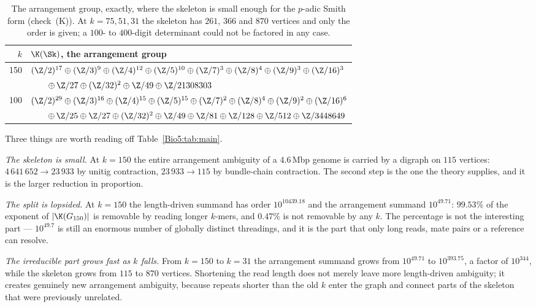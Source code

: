 \begin{table}[ht]
\centering\footnotesize
\begin{tabular}{rl}
\toprule
$k$ & $\K(\Sk)$, the arrangement group\\
\midrule
150 & $(\Z/2)^{17}\oplus(\Z/3)^{9}\oplus(\Z/4)^{12}\oplus(\Z/5)^{10}\oplus(\Z/7)^{3}
\oplus(\Z/8)^{4}\oplus(\Z/9)^{3}\oplus(\Z/16)^{3}$\\
    & $\qquad\oplus\,\Z/27\oplus(\Z/32)^{2}\oplus\Z/49\oplus\Z/21308303$\\[2pt]
100 & $(\Z/2)^{29}\oplus(\Z/3)^{16}\oplus(\Z/4)^{15}\oplus(\Z/5)^{15}\oplus(\Z/7)^{2}
\oplus(\Z/8)^{4}\oplus(\Z/9)^{2}\oplus(\Z/16)^{6}$\\
    & $\qquad\oplus\,\Z/25\oplus\Z/27\oplus(\Z/32)^{2}\oplus\Z/49\oplus\Z/81
\oplus\Z/128\oplus\Z/512\oplus\Z/3448649$\\
\bottomrule
\end{tabular}
\caption{The arrangement group, exactly, where the skeleton is small enough for the
$p$-adic Smith form (check~(K)). At $k=75,51,31$ the skeleton has $261$, $366$ and $870$
vertices and only the order is given; a $100$- to $400$-digit determinant could not be
factored in any case.}
\label{Bio5:tab:groups}
\end{table}

\begin{remark}\label{Bio5:rem:shape}
Three things are worth reading off Table~\ref{Bio5:tab:main}.

\emph{The skeleton is small.} At $k=150$ the entire arrangement ambiguity of a
$4.6$\,Mbp genome is carried by a digraph on $115$ vertices: $4\,641\,652\to23\,933$ by
unitig contraction, $23\,933\to115$ by bundle-chain contraction. The second step is the
one the theory supplies, and it is the larger reduction in proportion.

\emph{The split is lopsided.} At $k=150$ the length-driven summand has order
$10^{10439.18}$ and the arrangement summand $10^{49.71}$: $99.53\%$ of the exponent of
$|\K(G_{150})|$ is removable by reading longer $k$-mers, and $0.47\%$ is not removable by
any $k$. The percentage is not the interesting part --- $10^{49.7}$ is still an enormous
number of globally distinct threadings, and it is the part that only long reads, mate
pairs or a reference can resolve.

\emph{The irreducible part grows fast as $k$ falls.} From $k=150$ to $k=31$ the
arrangement summand grows from $10^{49.71}$ to $10^{393.75}$, a factor of $10^{344}$,
while the skeleton grows from $115$ to $870$ vertices. Shortening the read length does
not merely leave more length-driven ambiguity; it creates genuinely new arrangement
ambiguity, because repeats shorter than the old $k$ enter the graph and connect parts of
the skeleton that were previously unrelated.
\end{remark}

